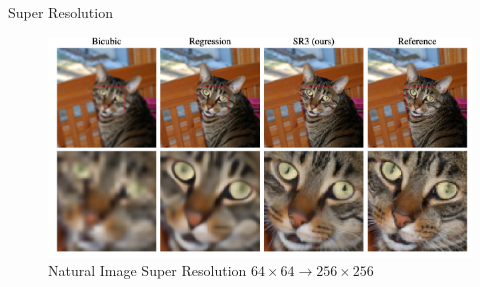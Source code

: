 \begin{frame}{Super Resolution}

\begin{figure}
    \centering
    \includegraphics[height=0.8\textheight, width=\textwidth, keepaspectratio]{images/diffusion/diff_results_11.png}
    \caption*{Natural Image Super Resolution $64 \times 64 \longrightarrow 256 \times 256$}
\end{figure}

\end{frame}